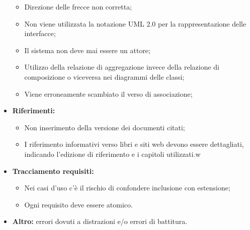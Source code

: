 \begin{itemize}
\begin{itemize}
		\item Direzione delle frecce non corretta;
		\item Non viene utilizzata la notazione UML 2.0 per la rappresentazione delle interfacce;
		\item Il sistema non deve mai essere un attore;
		\item Utilizzo della relazione di aggregazione invece della relazione di composizione o viceversa nei diagrammi delle classi;
		\item Viene erroneamente scambiato il verso di associazione;
	\end{itemize}
	\item \textbf{Riferimenti:}
	\begin{itemize}
		\item Non inserimento della versione dei documenti citati;
		\item I riferimento informativi verso libri e siti web devono essere dettagliati, indicando l'edizione di riferimento e i capitoli utilizzati.w
	\end{itemize}
	\item \textbf{Tracciamento requisiti:}
	\begin{itemize}
		\item Nei casi d'uso c'è il rischio di confondere inclusione con estensione;
		\item Ogni requisito deve essere atomico.
	\end{itemize}
	\item \textbf{Altro:} errori dovuti a distrazioni e/o errori di battitura.
\end{itemize}

